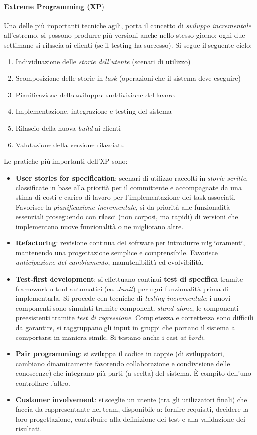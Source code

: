 \paragraph{Extreme Programming (XP)} Una delle più importanti tecniche agili, porta il concetto di \textit{sviluppo incrementale} all'estremo, si possono produrre più versioni anche nello stesso giorno; ogni due settimane si rilascia ai clienti (se il testing ha successo). Si segue il seguente ciclo:
\begin{enumerate}
    \item Individuazione delle \textit{storie dell'utente} (scenari di utilizzo)
    \item Scomposizione delle storie in \textit{task} (operazioni che il sistema deve eseguire)
    \item Pianificazione dello sviluppo; suddivisione del lavoro
    \item Implementazione, integrazione e testing del sistema
    \item Rilascio della nuova \textit{build} ai clienti
    \item Valutazione della versione rilasciata
\end{enumerate} Le pratiche più importanti dell'XP sono:
\begin{itemize}
    \item \textbf{User stories for specification}: scenari di utilizzo raccolti in \textit{storie scritte}, classificate in base alla priorità per il committente e accompagnate da una stima di costi e carico di lavoro per l'implementazione dei task associati. Favorisce la \textit{pianificazione incrementale}, si da priorità alle funzionalità essenziali proseguendo con rilasci (non corposi, ma rapidi) di versioni che implementano nuove funzionalità o ne migliorano altre.
    \item \textbf{Refactoring}: revisione continua del software per introdurre miglioramenti, mantenendo una progettazione semplice e comprensibile. Favorisce \textit{anticipazione del cambiamento}, manutenibilità ed evolvibilità.
    \item \textbf{Test-first development}: si effettuano continui \textbf{test di specifica} tramite framework o tool automatici (es. \textit{Junit}) per ogni funzionalità prima di implementarla. Si procede con tecniche di \textit{testing incrementale}: i nuovi componenti sono simulati tramite componenti \textit{stand-alone}, le componenti preesistenti tramite \textit{test di regressione}. Completezza e correttezza sono difficili da garantire, si raggruppano gli input in gruppi che portano il sistema a comportarsi in maniera simile. Si testano anche i casi \textit{ai bordi}.
    \item \textbf{Pair programming}: si sviluppa il codice in coppie (di sviluppatori, cambiano dinamicamente favorendo collaborazione e condivisione delle conoscenze) che integrano più parti (a scelta) del sistema. È compito dell'uno controllare l'altro.
    \item \textbf{Customer involvement}: si sceglie un utente (tra gli utilizzatori finali) che faccia da rappresentante nel team, disponibile a: fornire requisiti, decidere la loro progettazione, contribuire alla definizione dei test e alla validazione dei risultati.
\end{itemize}
